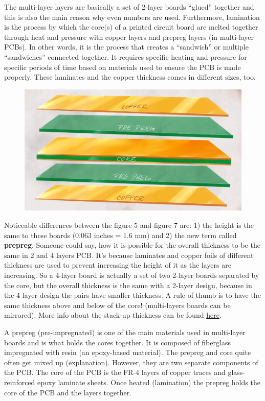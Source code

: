 \documentclass[final]{cubedoc}
\begin{document}
	The multi-layer layers are basically a set of 2-layer boards “glued” together and this is also the main reason why even numbers are used. Furthermore, lamination is the process by which the core(s) of a printed circuit board are melted together through heat and pressure with copper layers and prepreg layers (in multi-layer PCBs). In other words, it is the process that creates a “sandwich” or multiple “sandwiches” connected together. It requires specific heating and pressure for specific periods of time based on materials used to ensure the PCB is made properly.  These laminates and the copper thickness comes in different sizes, too.
	
	\begin{figure}[h!]
		\centering
		\includegraphics[height=.25\textheight]{assets/multi-layer-lamination.png}
		\caption{}
		\label{fig:my_label}
	\end{figure}
	
	Noticeable differences between the figure 5 and figure 7 are: 1) the height is the same to these boards (0.063 inches = 1.6 mm) and 2) the new term called \textbf{prepreg}. Someone could say, how it is possible for the overall thickness to be the same in 2 and 4 layers PCB. It’s because laminates and copper foils of different thickness are used to prevent increasing the height of it as the layers are increasing. So a 4-layer board is actually a set of two 2-layer boards separated by  the core, but the overall thickness is the same with a 2-layer design, because in the 4 layer-design the pairs have smaller thickness. A rule of thumb is to have the same thickness above and below of the core! (multi-layers boards can be mirrored). More info about the stack-up thickness can be found \href{https://www.cbspcb.com/pcboard-stackups/}{here}. 
	
	A prepreg (pre-impregnated) is one of the main materials used in multi-layer boards and is what holds the cores together. It is composed of fiberglass impregnated with resin (an epoxy-based material). The prepreg and core quite often get mixed up (\href{https://electronics.stackexchange.com/questions/356063/what-exactly-is-prepreg-and-core-in-a-pcb}{explanation}). However, they are two separate components of the PCB. The core of the PCB is the FR-4 layers of copper traces and glass-reinforced epoxy laminate sheets. Once heated (lamination) the prepreg holds the core of the PCB and the layers together.
	
\end{document}

